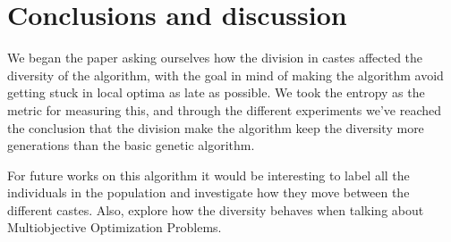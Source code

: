 \section{Conclusions and discussion}

We began the paper asking ourselves how the division in castes affected
the diversity of the algorithm, with the goal in mind of making the algorithm avoid getting stuck
in local optima as late as possible. We took the entropy as the metric for measuring this, and
through the different experiments we've reached the conclusion that the division make
the algorithm keep the diversity more generations than the basic genetic algorithm. 

For future works on this algorithm it would be interesting to label all the individuals in
the population and investigate how they move between the different castes. Also, explore
how the diversity behaves when talking about Multiobjective Optimization Problems.